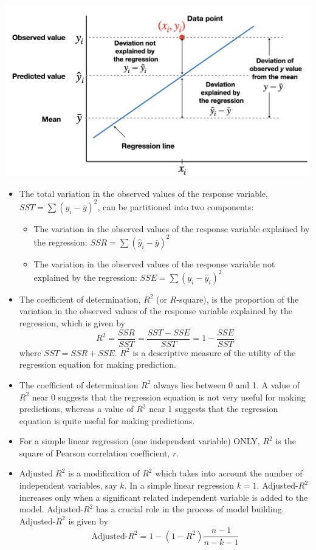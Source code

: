 \documentclass[
]{article}
\providecommand{\tightlist}{%
  \setlength{\itemsep}{0pt}\setlength{\parskip}{0pt}}
\begin{document}
\begin{center}\includegraphics[width=0.6\linewidth,height=0.6\textheight]{figures/cod5} \end{center}

\begin{itemize}
\item
  The total variation in the observed values of the response variable,
  \(SST=\sum(y_i-\bar{y})^2\), can be partitioned into two components:

  \begin{itemize}
  \tightlist
  \item
    The variation in the observed values of the response variable
    explained by the regression: \(SSR=\sum(\hat{y}_i-\bar{y})^2\)
  \item
    The variation in the observed values of the response variable not
    explained by the regression: \(SSE=\sum(y_i-\hat{y}_i)^2\)
  \end{itemize}
\item
  The coefficient of determination, \(R^2\) (or \(R\)-square), is the
  proportion of the variation in the observed values of the response
  variable explained by the regression, which is given by
  \[R^2=\frac{SSR}{SST}=\frac{SST-SSE}{SST}=1-\frac{SSE}{SST}\] where
  \(SST=SSR+SSE\). \(R^2\) is a descriptive measure of the utility of
  the regression equation for making prediction.
\item
  The coefficient of determination \(R^2\) always lies between 0 and 1.
  A value of \(R^2\) near 0 suggests that the regression equation is not
  very useful for making predictions, whereas a value of \(R^2\) near 1
  suggests that the regression equation is quite useful for making
  predictions.
\item
  For a simple linear regression (one independent variable) ONLY,
  \(R^2\) is the square of Pearson correlation coefficient, \(r\).
\item
  \(\text{Adjusted}\;R^2\) is a modification of \(R^2\) which takes into
  account the number of independent variables, say \(k\). In a simple
  linear regression \(k=1\). Adjusted-\(R^2\) increases only when a
  significant related independent variable is added to the model.
  Adjusted-\(R^2\) has a crucial role in the process of model building.
  Adjusted-\(R^2\) is given by
  \[\text{Adjusted-}R^2=1-(1-R^2)\frac{n-1}{n-k-1}\]
\end{itemize}
\end{document}

